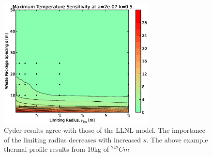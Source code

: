 \begin{figure}[htbp!]
\begin{center}
\includegraphics[width=0.7\textwidth]{./chapters/demonstration/spacing/rs.eps}
\end{center}
\caption[Thermal Sensitivity to $s$ and $r_{lim}$ Sensitivity in Cyder]
{Cyder results agree with those of the LLNL model. The importance of the 
limiting radius decreases with increased $s$. The above example thermal 
profile results from 10kg of $^{242}Cm$}
\label{fig:rs}
\end{figure}
